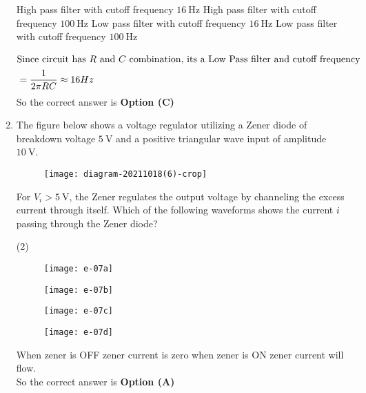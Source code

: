 \begin{enumerate}
\begin{tasks}
\task[\textbf{A.}] High pass filter with cutoff frequency $16 \mathrm{~Hz}$
\task[\textbf{B.}] High pass filter with cutoff frequency $100 \mathrm{~Hz}$
\task[\textbf{C.}] Low pass filter with cutoff frequency $16 \mathrm{~Hz}$
\task[\textbf{D.}] Low pass filter with cutoff frequency $100 \mathrm{~Hz}$
\end{tasks}
\begin{answer}
\begin{align*}
\intertext{Since circuit has $R$ and $C$ combination, its a Low Pass filter and cutoff frequency}
&=\frac{1}{2 \pi R C} \approx 16 H z
\end{align*}
So the correct answer is \textbf{Option (C)}
\end{answer}
	\item The figure below shows a voltage regulator utilizing a Zener diode of breakdown voltage $5 \mathrm{~V}$ and a positive triangular wave input of amplitude $10 \mathrm{~V}$.\\
	\begin{figure}[H]
		\centering
		\texttt{[image: diagram-20211018(6)-crop]}
	\end{figure}
	For $V_{i}>5 \mathrm{~V}$, the Zener regulates the output voltage by channeling the excess current through itself. Which of the following waveforms shows the current $i$ passing through the Zener diode?
{	}
\begin{tasks}(2)
\task[\textbf{A.}] \begin{figure}[H]
	\centering
	\texttt{[image: e-07a]}
\end{figure}
\task[\textbf{B.}] \begin{figure}[H]
	\centering
	\texttt{[image: e-07b]}
\end{figure}
\task[\textbf{C.}] \begin{figure}[H]
	\centering
	\texttt{[image: e-07c]}
\end{figure}
\task[\textbf{D.}] \begin{figure}[H]
	\centering
	\texttt{[image: e-07d]}
\end{figure}
\end{tasks}
\begin{answer}$\left. \right. $\\
When zener is OFF zener current is zero when zener is $\mathrm{ON}$ zener current will flow.\\
So the correct answer is \textbf{Option (A)}

\end{answer}
\end{enumerate}
